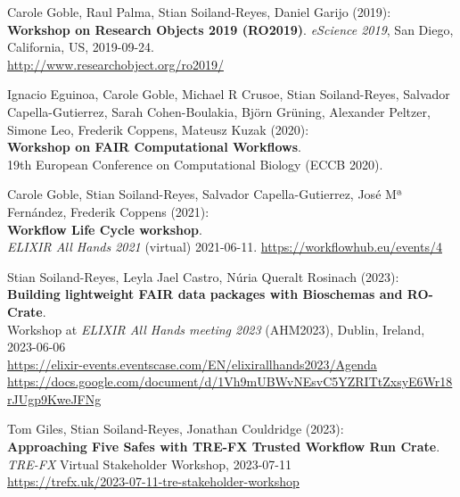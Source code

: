 

Carole Goble, Raul Palma, Stian Soiland-Reyes, Daniel Garijo (2019):\\
\textbf{Workshop on Research Objects 2019 (RO2019)}.
\emph{eScience 2019}, San Diego, California, US, 2019-09-24.\\
\url{http://www.researchobject.org/ro2019/}


Ignacio Eguinoa, Carole Goble, Michael R Crusoe, Stian Soiland-Reyes, Salvador Capella-Gutierrez, Sarah Cohen-Boulakia, Björn Grüning, Alexander Peltzer, Simone Leo, Frederik Coppens, Mateusz Kuzak (2020):\\
\textbf{{Workshop on FAIR Computational Workflows}}.\\
19th European Conference on Computational Biology ({ECCB 2020}).


Carole Goble, Stian Soiland-Reyes, Salvador Capella-Gutierrez, José Mª Fernández, Frederik Coppens (2021):\\
\textbf{Workflow Life Cycle workshop}.\\
\emph{ELIXIR All Hands 2021} (virtual) 2021-06-11.
\url{https://workflowhub.eu/events/4}

Stian Soiland-Reyes, Leyla Jael Castro, Núria Queralt Rosinach (2023):\\
\textbf{Building lightweight FAIR data packages with Bioschemas and RO-Crate}.\\
Workshop at \emph{ELIXIR All Hands meeting 2023} (AHM2023), Dublin, Ireland, 2023-06-06 \\
\url{https://elixir-events.eventscase.com/EN/elixirallhands2023/Agenda}
\url{https://docs.google.com/document/d/1Vh9mUBWvNEsvC5YZRITtZxsyE6Wr18rJUgp9KweJFNg}

Tom Giles, Stian Soiland-Reyes, Jonathan Couldridge (2023):\\
\textbf{Approaching Five Safes with TRE-FX Trusted Workflow Run Crate}.\\
\emph{TRE-FX} Virtual Stakeholder Workshop, 2023-07-11 \\
\url{https://trefx.uk/2023-07-11-tre-stakeholder-workshop}

